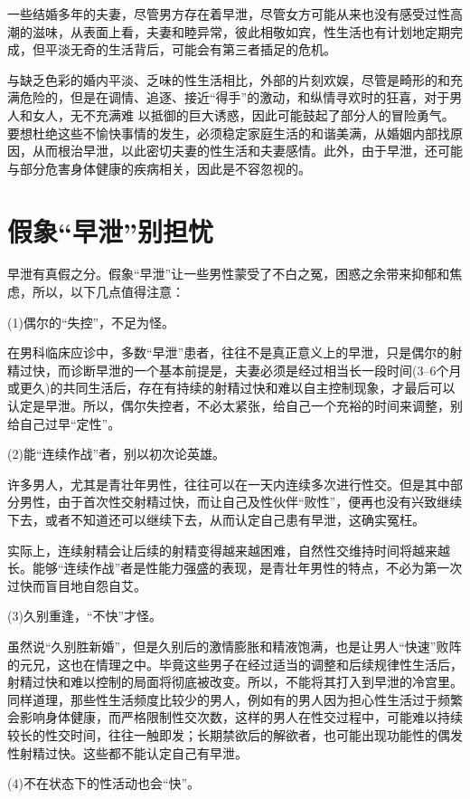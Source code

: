 \documentclass[12pt,UTF8]{ctexbook}
\begin{document}
一些结婚多年的夫妻，尽管男方存在着早泄，尽管女方可能从来也没有感受过性高潮的滋味，从表面上看，夫妻和睦异常，彼此相敬如宾，性生活也有计划地定期完成，但平淡无奇的生活背后，可能会有第三者插足的危机。

与缺乏色彩的婚内平淡、乏味的性生活相比，外部的片刻欢娱，尽管是畸形的和充满危险的，但是在调情、追逐、接近“得手”的激动，和纵情寻欢时的狂喜，对于男人和女人，无不充满难
以抵御的巨大诱惑，因此可能鼓起了部分人的冒险勇气。要想杜绝这些不愉快事情的发生，必须稳定家庭生活的和谐美满，从婚姻内部找原因，从而根治早泄，以此密切夫妻的性生活和夫妻感情。此外，由于早泄，还可能与部分危害身体健康的疾病相关，因此是不容忽视的。

\section{假象“早泄”别担忧}

早泄有真假之分。假象“早泄”让一些男性蒙受了不白之冤，困惑之余带来抑郁和焦虑，所以，以下几点值得注意：

(1)偶尔的“失控”，不足为怪。

在男科临床应诊中，多数“早泄”患者，往往不是真正意义上的早泄，只是偶尔的射精过快，而诊断早泄的一个基本前提是，夫妻必须是经过相当长一段时间(3--6个月或更久)的共同生活后，存在有持续的射精过快和难以自主控制现象，才最后可以认定是早泄。所以，偶尔失控者，不必太紧张，给自己一个充裕的时间来调整，别给自己过早“定性”。

(2)能“连续作战”者，别以初次论英雄。

许多男人，尤其是青壮年男性，往往可以在一天内连续多次进行性交。但是其中部分男性，由于首次性交射精过快，而让自己及性伙伴“败性”，便再也没有兴致继续下去，或者不知道还可以继续下去，从而认定自己患有早泄，这确实冤枉。

实际上，连续射精会让后续的射精变得越来越困难，自然性交维持时间将越来越长。能够“连续作战”者是性能力强盛的表现，是青壮年男性的特点，不必为第一次过快而盲目地自怨自艾。

(3)久别重逢，“不快”才怪。

虽然说“久别胜新婚”，但是久别后的激情膨胀和精液饱满，也是让男人“快速”败阵的元兄，这也在情理之中。毕竟这些男子在经过适当的调整和后续规律性生活后，射精过快和难以控制的局面将彻底被改变。所以，不能将其打入到早泄的冷宫里。同样道理，那些性生活频度比较少的男人，例如有的男人因为担心性生活过于频繁会影响身体健康，而严格限制性交次数，这样的男人在性交过程中，可能难以持续较长的性交时间，往往一触即发；长期禁欲后的解欲者，也可能出现功能性的偶发性射精过快。这些都不能认定自己有早泄。

(4)不在状态下的性活动也会“快”。
\end{document}
